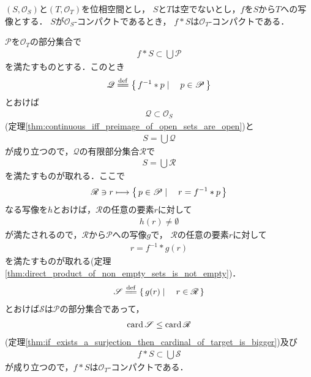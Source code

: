 	\begin{screen}
		\begin{thm}[コンパクト集合の連続写像による像はコンパクト]
			$(S,\mathscr{O}_{S})$と$(T,\mathscr{O}_{T})$を位相空間とし，
			$S$と$T$は空でないとし，$f$を$S$から$T$への写像とする．
			$S$が$\mathscr{O}_{S}$-コンパクトであるとき，
			$f \ast S$は$\mathscr{O}_{T}$-コンパクトである．
		\end{thm}
	\end{screen}
	
	\begin{sketch}
		$\mathscr{P}$を$\mathscr{O}_{T}$の部分集合で
		\begin{align}
			f \ast S \subset \bigcup \mathscr{P}
		\end{align}
		を満たすものとする．このとき
		\begin{align}
			\mathscr{Q} \defeq \Set{f^{-1} \ast p}{p \in \mathscr{P}}
		\end{align}
		とおけば
		\begin{align}
			\mathscr{Q} \subset \mathscr{O}_{S}
		\end{align}
		(定理\ref{thm:continuous_iff_preimage_of_open_sets_are_open})と
		\begin{align}
			S = \bigcup \mathscr{Q}
		\end{align}
		が成り立つので，$\mathscr{Q}$の有限部分集合$\mathscr{R}$で
		\begin{align}
			S = \bigcup \mathscr{R}
		\end{align}
		を満たすものが取れる．ここで
		\begin{align}
			\mathscr{R} \ni r \longmapsto \left\{\, p \in \mathscr{P} \mid \quad r = f^{-1} \ast p\, \right\}
		\end{align}
		なる写像を$h$とおけば，$\mathscr{R}$の任意の要素$r$に対して
		\begin{align}
			h(r) \neq \emptyset
		\end{align}
		が満たされるので，$\mathscr{R}$から$\mathscr{P}$への写像$g$で，
		$\mathscr{R}$の任意の要素$r$に対して
		\begin{align}
			r = f^{-1} \ast g(r)
		\end{align}
		を満たすものが取れる(定理\ref{thm:direct_product_of_non_empty_sets_is_not_empty})．
		\begin{align}
			\mathscr{S} \defeq \Set{g(r)}{r \in \mathscr{R}}
		\end{align}
		とおけば$\mathscr{S}$は$\mathscr{P}$の部分集合であって，
		\begin{align}
			\operatorname{card} \mathscr{S} \leq \operatorname{card} \mathscr{R}
		\end{align}
		(定理\ref{thm:if_exists_a_surjection_then_cardinal_of_target_is_bigger})及び
		\begin{align}
			f \ast S \subset \bigcup \mathscr{S}
		\end{align}
		が成り立つので，$f \ast S$は$\mathscr{O}_{T}$-コンパクトである．
		\QED
	\end{sketch}
	
